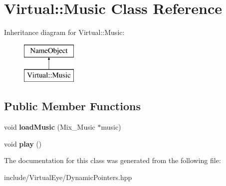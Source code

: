 \hypertarget{class_virtual_1_1_music}{}\section{Virtual\+:\+:Music Class Reference}
\label{class_virtual_1_1_music}
Inheritance diagram for Virtual\+:\+:Music\+:\begin{figure}[H]
\begin{center}
\leavevmode
\includegraphics[height=2.000000cm]{class_virtual_1_1_music}
\end{center}
\end{figure}
\subsection*{Public Member Functions}
\begin{DoxyCompactItemize}
\item 
\hypertarget{class_virtual_1_1_music_a0fc4f3eab54d97628eb130a00794ecd8}{}\label{class_virtual_1_1_music_a0fc4f3eab54d97628eb130a00794ecd8} 
void {\bfseries load\+Music} (Mix\+\_\+\+Music $\ast$music)
\item 
\hypertarget{class_virtual_1_1_music_a24b6650bc34f9a2ad0f38d8ecf0092d5}{}\label{class_virtual_1_1_music_a24b6650bc34f9a2ad0f38d8ecf0092d5} 
void {\bfseries play} ()
\end{DoxyCompactItemize}


The documentation for this class was generated from the following file\+:\begin{DoxyCompactItemize}
\item 
include/\+Virtual\+Eye/Dynamic\+Pointers.\+hpp\end{DoxyCompactItemize}
